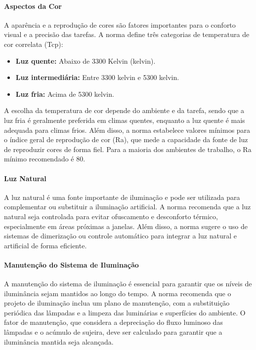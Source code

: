 \paragraph{Aspectos da Cor}

A aparência e a reprodução de cores são fatores importantes para o conforto visual e a precisão das tarefas. A norma define três categorias de temperatura de cor correlata (\gls{Tcp}):

\begin{itemize}
    \item \textbf{Luz quente:} Abaixo de 3300 Kelvin (\gls{kelvin}).
    \item \textbf{Luz intermediária:} Entre 3300 \gls{kelvin} e 5300 \gls{kelvin}.
    \item \textbf{Luz fria:} Acima de 5300 \gls{kelvin}. 
\end{itemize}

A escolha da temperatura de cor depende do ambiente e da tarefa, sendo que a luz fria é geralmente preferida em climas quentes, enquanto a luz quente é mais adequada para climas frios. Além disso, a norma estabelece valores mínimos para o índice geral de reprodução de cor (\gls{Ra}), que mede a capacidade da fonte de luz de reproduzir cores de forma fiel. Para a maioria dos ambientes de trabalho, o \gls{Ra} mínimo recomendado é 80.

\paragraph{Luz Natural}

A luz natural é uma fonte importante de iluminação e pode ser utilizada para complementar ou substituir a iluminação artificial. A norma recomenda que a luz natural seja controlada para evitar ofuscamento e desconforto térmico, especialmente em áreas próximas a janelas. Além disso, a norma sugere o uso de sistemas de dimerização ou controle automático para integrar a luz natural e artificial de forma eficiente.

\paragraph{Manutenção do Sistema de Iluminação}

A manutenção do sistema de iluminação é essencial para garantir que os níveis de iluminância sejam mantidos ao longo do tempo. A norma recomenda que o projeto de iluminação inclua um plano de manutenção, com a substituição periódica das lâmpadas e a limpeza das luminárias e superfícies do ambiente. O fator de manutenção, que considera a depreciação do fluxo luminoso das lâmpadas e o acúmulo de sujeira, deve ser calculado para garantir que a iluminância mantida seja alcançada.

